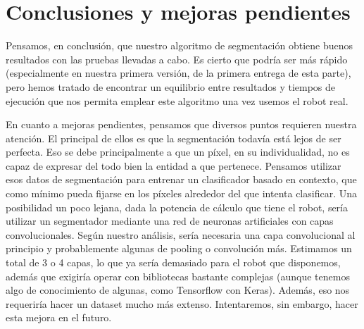 \documentclass{article}
\begin{document}
\section{Conclusiones y mejoras pendientes}

	Pensamos, en conclusión, que nuestro algoritmo de segmentación obtiene buenos resultados con las pruebas llevadas a cabo. Es cierto que podría ser más rápido (especialmente en nuestra primera versión, de la primera entrega de esta parte), pero hemos tratado de encontrar un equilibrio entre resultados y tiempos de ejecución que nos permita emplear este algoritmo una vez usemos el robot real.
	
	En cuanto a mejoras pendientes, pensamos que diversos puntos requieren nuestra atención. El principal de ellos es que la segmentación todavía está lejos de ser perfecta. Eso se debe principalmente a que un píxel, en su individualidad, no es capaz de expresar del todo bien la entidad a que pertenece. Pensamos utilizar esos datos de segmentación para entrenar un clasificador basado en contexto, que como mínimo pueda fijarse en los píxeles alrededor del que intenta clasificar. Una posibilidad un poco lejana, dada la potencia de cálculo que tiene el robot, sería utilizar un segmentador mediante una red de neuronas artificiales con capas convolucionales. Según nuestro análisis, sería necesaria una capa convolucional al principio y probablemente algunas de pooling o convolución más. Estimamos un total de 3 o 4 capas, lo que ya sería demasiado para el robot que disponemos, además que exigiría operar con bibliotecas bastante complejas (aunque tenemos algo de conocimiento de algunas, como Tensorflow con Keras). Además, eso nos requeriría hacer un dataset mucho más extenso. Intentaremos, sin embargo, hacer esta mejora en el futuro.








\end{document}

